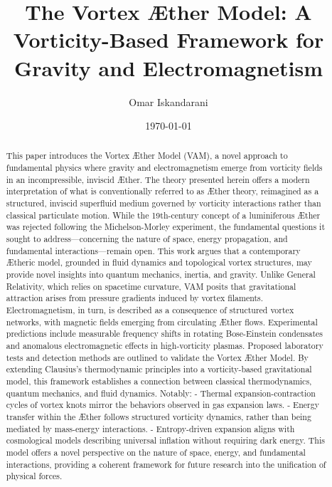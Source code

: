 \documentclass[a4paper,10pt]{article}
\title{The Vortex \AE ther Model: A Vorticity-Based Framework for Gravity and Electromagnetism}
\author{Omar Iskandarani}
\date{\today}
\begin{document}
    \maketitle

    \maketitle

    \begin{abstract}
        This paper introduces the Vortex \AE ther Model (VAM), a novel approach to fundamental physics where gravity and electromagnetism emerge from vorticity fields in an incompressible, inviscid \AE ther. The theory presented herein offers a modern interpretation of what is conventionally referred to as Æther theory, reimagined as a structured, inviscid superfluid medium governed by vorticity interactions rather than classical particulate motion. While the 19th-century concept of a luminiferous Æther was rejected following the Michelson-Morley experiment, the fundamental questions it sought to address—concerning the nature of space, energy propagation, and fundamental interactions—remain open. This work argues that a contemporary Ætheric model, grounded in fluid dynamics and topological vortex structures, may provide novel insights into quantum mechanics, inertia, and gravity.        Unlike General Relativity, which relies on spacetime curvature, VAM posits that gravitational attraction arises from pressure gradients induced by vortex filaments. Electromagnetism, in turn, is described as a consequence of structured vortex networks, with magnetic fields emerging from circulating Æther flows. Experimental predictions include measurable frequency shifts in rotating Bose-Einstein condensates and anomalous electromagnetic effects in high-vorticity plasmas. Proposed laboratory tests and detection methods are outlined to validate the Vortex Æther Model.        By extending Clausius’s thermodynamic principles into a vorticity-based gravitational model, this framework establishes a connection between classical thermodynamics, quantum mechanics, and fluid dynamics. Notably:        - Thermal expansion-contraction cycles of vortex knots mirror the behaviors observed in gas expansion laws.        - Energy transfer within the Æther follows structured vorticity dynamics, rather than being mediated by mass-energy interactions.        - Entropy-driven expansion aligns with cosmological models describing universal inflation without requiring dark energy.        This model offers a novel perspective on the nature of space, energy, and fundamental interactions, providing a coherent framework for future research into the unification of physical forces.
    \end{abstract}
\end{document}
